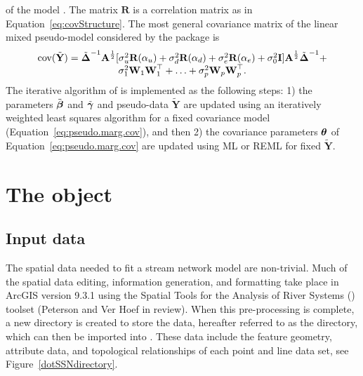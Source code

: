 \documentclass[nojss]{jss}
\def\btheta{\mbox{\boldmath $\theta$}}
\def\bbeta{\mbox{\boldmath $\beta$}}
\def\bgamma{\mbox{\boldmath $\gamma$}}
\def\bDelta{\mbox{\boldmath $\Delta$}}
\def\bA{\textbf{A}}
\def\bY{\textbf{Y}}
\def\bR{\textbf{R}}
\def\bW{\textbf{W}}
\def\bI{\textbf{I}}
\def\cov{\textrm{cov}}
\begin{document}
of the model \citep*[e.g.,][Table 2.1]{McCu:Neld:gene:1989}. The
matrix $\bR$ is a correlation matrix as in
Equation~\ref{eq:covStructure}.  The most general covariance matrix of
the linear mixed pseudo-model considered by the  package is
%
%
\begin{equation} \label{eq:pseudo.marg.cov}
	\begin{array}{c}
  \cov(\tilde{\bY}) = \tilde{\bDelta}^{-1}\bA^{\frac{1}{2}}
	[\sigma_u^2\bR(\alpha_u) + \sigma_d^2\bR(\alpha_d) +
	\sigma_e^2\bR(\alpha_e) + \sigma_0^2\bI]
	\bA^{\frac{1}{2}}\tilde{\bDelta}^{-1} + \\
	\sigma_1^2\bW_1\bW_1^\top + \ldots +
	\sigma_p^2\bW_p\bW_p^\top.
	\end{array}
\end{equation}
The iterative algorithm of \citet{Wolf:Ocon:gene:1993} is implemented
as the following steps: 1) the parameters $\tilde{\bbeta}$ and
$\tilde{\bgamma}$ and pseudo-data $\tilde{\bY}$ are updated using an
iteratively weighted least squares algorithm
\citep[e.g.,][pg. 40]{McCu:Neld:gene:1989} for a fixed covariance
model (Equation~\ref{eq:pseudo.marg.cov}), and then 2) the covariance
parameters $\btheta$ of Equation~\ref{eq:pseudo.marg.cov} are updated
using ML or REML for fixed $\tilde{\bY}$.

%
%

\section[The S4 SpatialStreamNetwork object]{The   object} \label{S4SSNobject}

\subsection{Input data}

The spatial data needed to fit a stream network model are
non-trivial. Much of the spatial data editing, information generation,
and formatting take place in ArcGIS version 9.3.1 using the Spatial
Tools for the Analysis of River Systems () toolset
(Peterson and Ver Hoef in review). When this pre-processing is
complete, a new directory is created to store the data, hereafter
referred to as the  directory, which can then be imported
into . These data include the feature geometry, attribute
data, and topological relationships of each point and line data set,
see Figure~\ref{dotSSNdirectory}.
\end{document}
